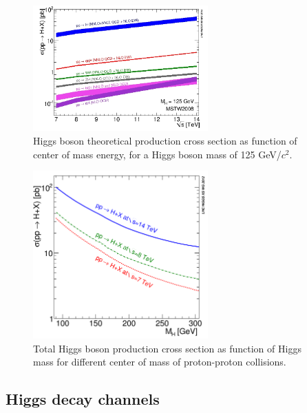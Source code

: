\begin{figure}[!Hhtbp]
  \begin{center}
    \includegraphics[width=0.6\textwidth]{figs/7-14_Higgs_xsec.jpg}
    \caption{Higgs boson theoretical production cross section as function of center of mass energy, for a Higgs boson mass of 125 GeV/$c^{2}$.}
    \label{fig:HiggsProdXS}
  \end{center}
\end{figure}

\begin{figure}[!Hhtbp]
  \begin{center}
    \includegraphics[width=0.6\textwidth]{figs/totalXS_LM.png}
    \caption{Total Higgs boson production cross section as function of Higgs mass for different center of mass of proton-proton collisions.}
    \label{fig:TotalHiggsXS}
  \end{center}
\end{figure}


\subsection{Higgs decay channels}

